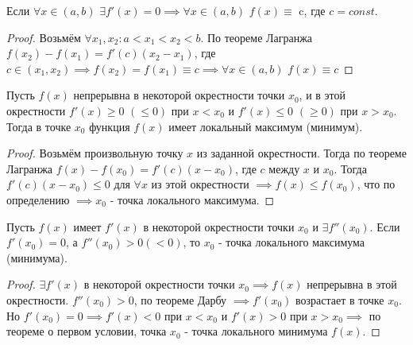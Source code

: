 \begin{theorem}[О константе]
    Если $\forall x \in (a, b)$  $\exists f'(x) = 0 \implies \forall x \in (a, b)$ $f(x) \equiv$ c, где $c = const$.
\end{theorem}
\begin{proof}
    Возьмём $\forall x_1, x_2: a < x_1 < x_2 < b$. По теореме Лагранжа $f(x_2) - f(x_1) = f'(c)(x_2-x_1)$, где $c \in (x_1, x_2) \implies f(x_2) = f(x_1) \equiv c \implies \forall x \in (a, b)$ $f(x) \equiv c$
\end{proof}

\begin{theorem}
    Пусть $f(x)$ непрерывна в некоторой окрестности точки $x_0$, и в этой окрестности $f'(x) \geq 0$ $(\leq 0)$ при $x < x_0$ и $f'(x) \leq 0$ $(\geq 0)$ при $x > x_0$. Тогда в точке $x_0$ функция $f(x)$ имеет локальный максимум (минимум).
\end{theorem}
\begin{proof}
    Возьмём произвольную точку $x$ из заданной окрестности. Тогда по теореме Лагранжа $f(x)-f(x_0) = f'(c)(x - x_0)$, где $c$ между $x$ и $x_0$. Тогда $f'(c)(x - x_0) \leq 0$ для $\forall x$ из этой окрестности $\implies f(x) \leq f(x_0)$, что по определению $\implies x_0$ - точка локального максимума.
\end{proof}

\begin{theorem}
    Пусть $f(x)$ имеет $f'(x)$ в некоторой окрестности точки $x_0$ и $\exists f''(x_0)$. Если $f'(x_0) = 0$, а $f''(x_0) > 0 (< 0)$, то $x_0$ - точка локального максимума (минимума).
\end{theorem}
\begin{proof}
    $\exists f'(x)$ в некоторой окрестности точки $x_0 \implies f(x)$ непрерывна в этой окрестности. $f''(x_0) > 0$, по теореме Дарбу $\implies f'(x_0)$ возрастает в точке $x_0$. Но $f'(x_0) = 0 \implies f'(x) < 0$ при $x < x_0$ и $f'(x) > 0$ при $x > x_0 \implies$ по теореме о первом условии, точка $x_0$ - точка локального минимума $f(x)$.
\end{proof}


